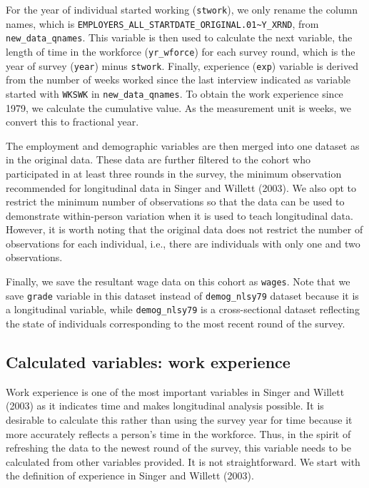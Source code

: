 \documentclass{article}
\begin{document}
For the year of individual started working (\texttt{stwork}), we only rename the column names, which is \texttt{EMPLOYERS\_ALL\_STARTDATE\_ORIGINAL.01\textasciitilde{}Y\_XRND}, from \texttt{new\_data\_qnames}. This variable is then used to calculate the next variable, the length of time in the workforce (\texttt{yr\_wforce}) for each survey round, which is the year of survey (\texttt{year}) minus \texttt{stwork}. Finally, experience (\texttt{exp}) variable is derived from the number of weeks worked since the last interview indicated as variable started with \texttt{WKSWK} in \texttt{new\_data\_qnames}. To obtain the work experience since 1979, we calculate the cumulative value. As the measurement unit is weeks, we convert this to fractional year.

The employment and demographic variables are then merged into one dataset as in the original data. These data are further filtered to the cohort who participated in at least three rounds in the survey, the minimum observation recommended for longitudinal data in Singer and Willett (2003). We also opt to restrict the minimum number of observations so that the data can be used to demonstrate within-person variation when it is used to teach longitudinal data. However, it is worth noting that the original data does not restrict the number of observations for each individual, i.e., there are individuals with only one and two observations.

Finally, we save the resultant wage data on this cohort as \texttt{wages}. Note that we save \texttt{grade} variable in this dataset instead of \texttt{demog\_nlsy79} dataset because it is a longitudinal variable, while \texttt{demog\_nlsy79} is a cross-sectional dataset reflecting the state of individuals corresponding to the most recent round of the survey.

\hypertarget{calculated-variables-work-experience}{%
\subsection{Calculated variables: work experience}\label{calculated-variables-work-experience}}

Work experience is one of the most important variables in Singer and Willett (2003) as it indicates time and makes longitudinal analysis possible. It is desirable to calculate this rather than using the survey year for time because it more accurately reflects a person's time in the workforce. Thus, in the spirit of refreshing the data to the newest round of the survey, this variable needs to be calculated from other variables provided. It is not straightforward. We start with the definition of experience in Singer and Willett (2003).
\end{document}
